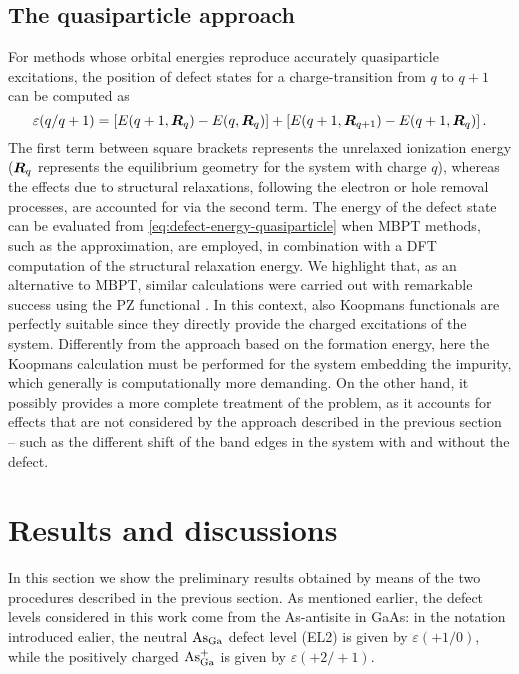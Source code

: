 \subsection{The quasiparticle approach\label{sec:defect-quasiparticle-approach}}
For methods whose orbital energies reproduce accurately quasiparticle excitations, the position of defect states for a charge-transition from $q$ to $q+1$ can be computed as \cite{chen_first-principles_2015}
%
\begin{equation}
    \varepsilon(q/q+1) = \left[ E(q+1,{\bm R}_q) - E(q,{\bm R}_q) \right] + \left[ E(q+1,{\bm R}_{q+1}) - E(q+1,{\bm R}_q) \right] .
    \label{eq:defect-energy-quasiparticle}
\end{equation}
%
The first term between square brackets represents the unrelaxed ionization energy (${\bm R}_q$ represents the equilibrium geometry for the system with charge $q$), whereas the effects due to structural relaxations, following the electron or hole removal processes, are accounted for via the second term. The energy of the defect state can be evaluated from \cref{eq:defect-energy-quasiparticle} when MBPT methods, such as the \gw approximation, are employed, in combination with a DFT computation of the structural relaxation energy. We highlight that, as an alternative to MBPT, similar calculations were carried out with remarkable success using the PZ functional \cite{gudmundsdottir_calculations_2015}. In this context, also Koopmans functionals are perfectly suitable since they directly provide the charged excitations of the system. Differently from the approach based on the formation energy, here the Koopmans calculation must be performed for the system embedding the impurity, which generally is computationally more demanding. On the other hand, it possibly provides a more complete treatment of the problem, as it accounts for effects that are not considered by the approach described in the previous section -- such as the different shift of the band edges in the system with and without the defect.

\section{Results and discussions\label{sec:defects-results}}
In this section we show the preliminary results obtained by means of the two procedures described in the previous section. As mentioned earlier, the defect levels considered in this work come from the As-antisite in GaAs: in the notation introduced ealier, the neutral $\rm As_{Ga}$ defect level (EL2) is given by $\varepsilon(+1/0)$, while the positively charged $\rm As_{Ga}^+$ is given by $\varepsilon(+2/+1)$.

